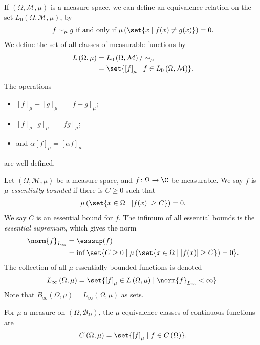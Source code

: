 \begin{definition}
  If $\left(\Omega,\mathcal{M},\mu\right)$ is a measure space, we can define an equivalence relation on the set $L_{0}\left(\Omega,\mathcal{M},\mu\right)$, by
  \begin{align*}
    f\sim_{\mu}g \text{ if and only if } \mu\left(\set{x\mid f(x)\neq g(x)}\right) = 0.
  \end{align*}
  We define the set of all classes of measurable functions by
  \begin{align*}
    L\left(\Omega,\mu\right) &= L_{0}\left(\Omega,\mathcal{M}\right)/\sim_{\mu}\\
                             &= \set{\left[f\right]_{\mu}\mid f\in L_{0}\left(\Omega,\mathcal{M}\right)}.
  \end{align*}
\end{definition}
\begin{fact}
  The operations
  \begin{itemize}
    \item $\displaystyle \left[f\right]_{\mu} + \left[g\right]_{\mu} = \left[f + g\right]_{\mu}$;
    \item $\displaystyle \left[f\right]_{\mu}\left[g\right]_{\mu} = \left[fg\right]_{\mu}$;
    \item and $\displaystyle \alpha \left[f\right]_{\mu} = \left[\alpha f\right]_{\mu}$
  \end{itemize}
  are well-defined.
\end{fact}
\begin{definition}
  Let $\left(\Omega,\mathcal{M},\mu\right)$ be a measure space, and $f\colon \Omega\rightarrow \C$ be measurable. We say $f$ is \textit{$\mu$-essentially bounded} if there is $C\geq 0$ such that
  \begin{align*}
    \mu\left(\set{x\in \Omega\mid \left\vert f(x) \right\vert\geq C}\right) = 0.
  \end{align*}
  We say $C$ is an essential bound for $f$. The infimum of all essential bounds is the \textit{essential supremum}, which gives the norm
  \begin{align*}
    \norm{f}_{L_\infty} &= \esssup(f)\\
                      &= \inf\set{C\geq 0 \mid \mu\left(\set{x\in \Omega\mid \left\vert f(x) \right\vert\geq C}\right) = 0}.
  \end{align*}
  The collection of all $\mu$-essentially bounded functions is denoted
  \begin{align*}
    L_{\infty}\left(\Omega,\mu\right) = \set{\left[f\right]_{\mu}\in L\left(\Omega,\mu\right)\mid \norm{f}_{L_\infty} < \infty}.
  \end{align*}
  Note that $B_{\infty}\left(\Omega,\mu\right) = L_{\infty}\left(\Omega,\mu\right)$ as sets.\newline

  For $\mu$ a measure on $\left(\Omega,\mathcal{B}_{\Omega}\right)$, the $\mu$-equivalence classes of continuous functions are
  \begin{align*}
    C\left(\Omega,\mu\right) = \set{\left[f\right]_{\mu}\mid f\in C\left(\Omega\right)}.
  \end{align*}
\end{definition}
